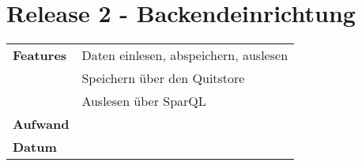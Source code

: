 
\section*{Release 2 - Backendeinrichtung }
\label{sec:release_2}

\begin{tabular}{p{5cm} p{9cm}}
    \textbf{Features} &  Daten einlesen, abspeichern, auslesen \\
    & Speichern über den Quitstore \\
    & Auslesen über SparQL  \\
    \hline
    \textbf{Aufwand} & \\
    \hline
    \textbf{Datum} & 
\end{tabular}
